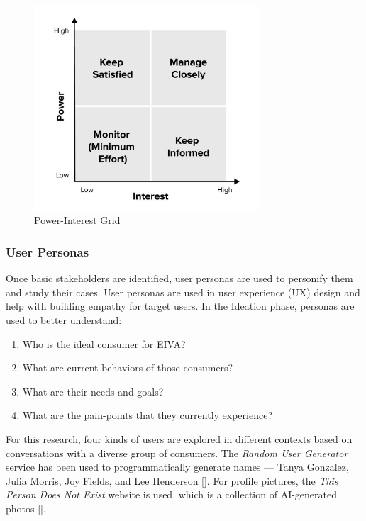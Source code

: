 \documentclass{article}
\begin{document}
\begin{figure}[h]
	\centering
	\includegraphics[width=0.75\textwidth]{power-interest.jpg}
	\caption{Power-Interest Grid}
	\label{fig:checkbox}
\end{figure}

\subsubsection{User Personas}

Once basic stakeholders are identified, user personas are used to personify them and study their cases. User personas are used in user experience (UX) design and help with building empathy for target users. In the Ideation phase, personas are used to better understand:

\begin{enumerate}
	\item Who is the ideal consumer for EIVA?
	\item What are current behaviors of those consumers?
	\item What are their needs and goals?
	\item What are the pain-points that they currently experience?
\end{enumerate}

For this research, four kinds of users are explored in different contexts based on conversations with a diverse group of consumers. The \emph{Random User Generator} service has been used to programmatically generate names --- Tanya Gonzalez, Julia Morris, Joy Fields, and Lee Henderson []. For profile pictures, the \emph{This Person Does Not Exist} website is used, which is a collection of AI-generated photos [].
\end{document}
